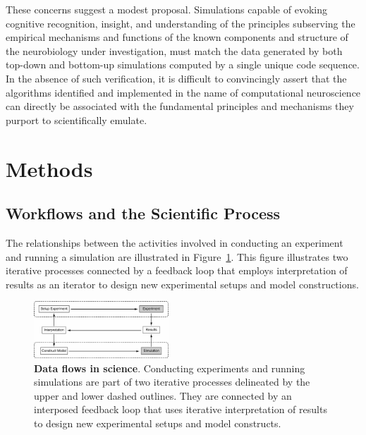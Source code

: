 \documentclass[11pt,3p,twocolumn]{JMN}
\begin{document}
These concerns suggest a modest proposal. Simulations capable of evoking cognitive recognition, insight, and understanding of the principles subserving the empirical mechanisms and functions of the known components and structure of the neurobiology under investigation, must match the data generated by both top-down and bottom-up simulations computed by a single unique code sequence. In the absence of such verification, it is difficult to convincingly assert that the algorithms identified and implemented in the name of computational neuroscience can directly be associated with the fundamental principles and mechanisms they purport to scientifically emulate.



\section{Methods}

\subsection{Workflows and the Scientific Process}

The relationships between the activities involved in conducting an experiment and running a simulation are illustrated in Figure~\ref{fig:exp-sim}. This figure illustrates two iterative processes connected by a feedback loop that employs interpretation of results as an iterator to design new experimental setups and model constructions.

\begin{figure}[h!t]
  \begin{center}
    \includegraphics[width=0.45\textwidth]{figures/exp-sim.pdf}
  \end{center}
  \caption{ \small{\textbf{Data flows in science}. Conducting experiments and running simulations are part of two iterative processes delineated by the upper and lower dashed outlines. They are connected by an interposed feedback loop that uses iterative interpretation of results to design new experimental setups and model constructs.}}
    \label{fig:exp-sim}
\end{figure}
\end{document}
